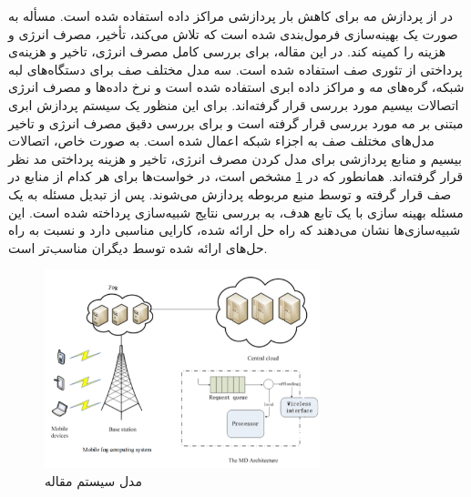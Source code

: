     در \cite{liu2017multiobjective} از پردازش مه برای کاهش بار پردازشی مراکز داده استفاده شده است.
    مسأله به صورت یک بهینه‌سازی فرمول‌بندی شده است که تلاش می‌کند، تأخیر، مصرف انرژی و هزینه را کمینه کند.
    در این مقاله، برای بررسی کامل مصرف انرژی، تاخیر و هزینه‌ی پرداختی از تئوری صف استفاده شده است.
    سه مدل مختلف صف برای دستگاه‌های لبه شبکه، گره‌های مه و مراکز داده ابری استفاده شده است و نرخ داده‌ها و مصرف انرژی اتصالات بیسیم مورد بررسی قرار گرفته‌اند.
    برای این منظور یک سیستم پردازش ابری مبتنی بر مه مورد بررسی قرار گرفته است و برای بررسی دقیق مصرف انرژی و تاخیر مدل‌های مختلف صف به اجزاء شبکه اعمال شده است.
    به صورت خاص، اتصالات بیسیم و منابع پردازشی برای مدل کردن مصرف انرژی، تاخیر و هزینه پرداختی مد نظر قرار گرفته‌اند.
    همانطور که در \cref{fig:chapter_2:system_model_liu2017multiobjective} مشخص است، در خواست‌ها برای هر کدام از منابع در صف قرار گرفته و توسط منبع مربوطه پردازش می‌شوند.
    پس از تبدیل مسئله به یک مسئله بهینه سازی با یک تابع هدف، به بررسی نتایج شبیه‌سازی پرداخته شده است.
    این شبیه‌سازی‌ها نشان می‌دهند که راه حل ارائه شده، کارایی مناسبی دارد و نسبت به راه حل‌های ارائه شده توسط دیگران مناسب‌تر است.

    \begin{figure}[h]
      \centerline{\includegraphics[width=8cm]{graphics/chapter_2/system_model_liu2017multiobjective}}
      \caption{مدل سیستم مقاله \cite{liu2017multiobjective}}
      \label{fig:chapter_2:system_model_liu2017multiobjective}
    \end{figure}

